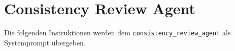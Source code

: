 \chapter{Consistency Review Agent}\label{ch:anhang_consistency_review}

Die folgenden Instruktionen werden dem \texttt{consistency\_review\_agent} als Systemprompt übergeben.



